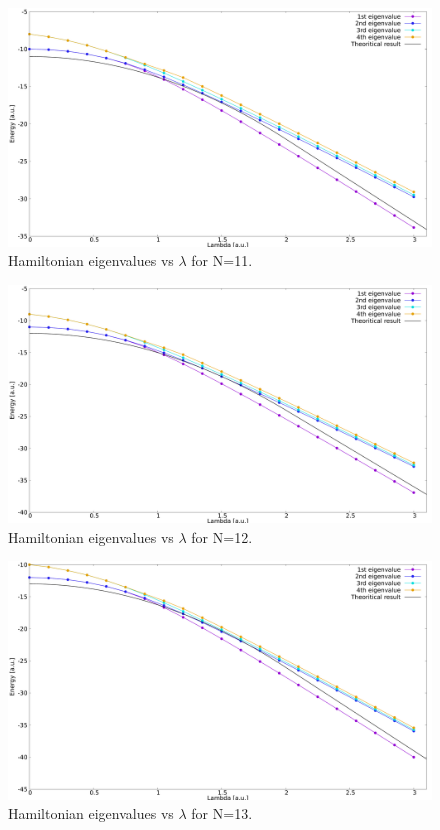 \documentclass[12pt, a4paper, notitlepage]{report}
\begin{document}
\begin{figure}
	\centering
	\includegraphics[scale=0.3]{4_eigval_vs_lambda_N11}
	\caption{Hamiltonian eigenvalues vs $\lambda$ for N=11.}
	\label{figure_lambdas}
\end{figure}

\begin{figure}
	\centering
	\includegraphics[scale=0.3]{4_eigval_vs_lambda_N12}
	\caption{Hamiltonian eigenvalues vs $\lambda$ for N=12.}
	\label{figure_lambdas}
\end{figure}

\begin{figure}
	\centering
	\includegraphics[scale=0.3]{4_eigval_vs_lambda_N13}
	\caption{Hamiltonian eigenvalues vs $\lambda$ for N=13.}
	\label{figure_lambdas}
\end{figure}
\end{document}

